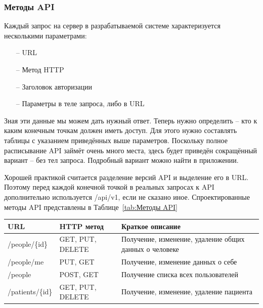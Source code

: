\documentclass[a4paper,article]{article}
\begin{document}
\begin{sloppypar}
    \subsubsection{Методы API}

    Каждый запрос на сервер в разрабатываемой системе характеризуется несколькими параметрами:

    \begin{itemize}[nolistsep]
        \item[--] URL
        \item[--] Метод HTTP
        \item[--] Заголовок авторизации
        \item[--] Параметры в теле запроса, либо в URL
    \end{itemize}

    Зная эти данные мы можем дать нужный ответ. Теперь нужно определить -- кто к каким конечным точкам должен иметь доступ. Для этого нужно составлять таблицы с указанием приведённых выше параметров. Поскольку полное расписывание API займёт очень много места, здесь будет приведён сокращённый вариант -- без тел запроса. Подробный вариант можно найти в приложении.

    Хорошей практикой считается разделение версий API и выделение его в URL. Поэтому перед каждой конечной точкой в реальных запросах к API дополнительно используется /api/v1, если не сказано иное. Спроектированные методы API представлены в Таблице~\ref{tab:Методы API}

    \begin{xltabular}{\textwidth} { |
        >{\hsize} X |
        >{\hsize} X |
        >{\hsize} X | }

        \hline
        URL & HTTP метод & Краткое описание \\

        \hline
        /people/\{id\}
        & GET, PUT, DELETE
        & Получение, изменение, удаление общих данных о человеке \\

        \hline
        /people/me
        & PUT, GET
        & Получение, изменение данных о себе \\

        \hline
        /people
        & POST, GET
        & Получение списка всех пользователей \\

        \hline
        /patients/\{id\}
        & GET, PUT, DELETE
        & Получение, изменение, удаление пациента \\


\end{xltabular}
\end{sloppypar}
\end{document}

